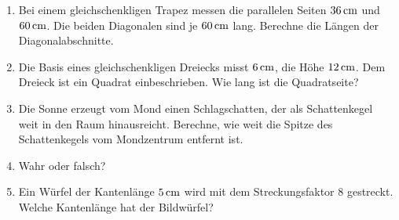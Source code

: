 \documentclass[%
11pt,%
twoside,%
titlepage,%
a4page,%
headsepline%
]{scrartcl}
\begin{document}
\begin{enumerate}
\item Bei einem gleichschenkligen Trapez messen die parallelen Seiten $\unit[36]{cm}$ und $\unit[60]{cm}$. Die beiden Diagonalen sind je $\unit[60]{cm}$ lang. Berechne die L\"angen der Diagonalabschnitte.
\item Die Basis eines gleichschenkligen Dreiecks misst $\unit[6]{cm}$, die H\"ohe $\unit[12]{cm}$. Dem Dreieck ist ein Quadrat einbeschrieben. Wie lang ist die Quadratseite?
\item Die Sonne erzeugt vom Mond einen Schlagschatten, der als Schattenkegel weit in den Raum hinausreicht. Berechne, wie weit die Spitze des Schattenkegels vom Mondzentrum entfernt ist.

\item Wahr oder falsch?
\item Ein W\"urfel der Kantenl\"ange $\unit[5]{cm}$ wird mit dem Streckungsfaktor $8$ gestreckt. Welche Kantenl\"ange hat der Bildw\"urfel?


\end{enumerate}
\end{document}
